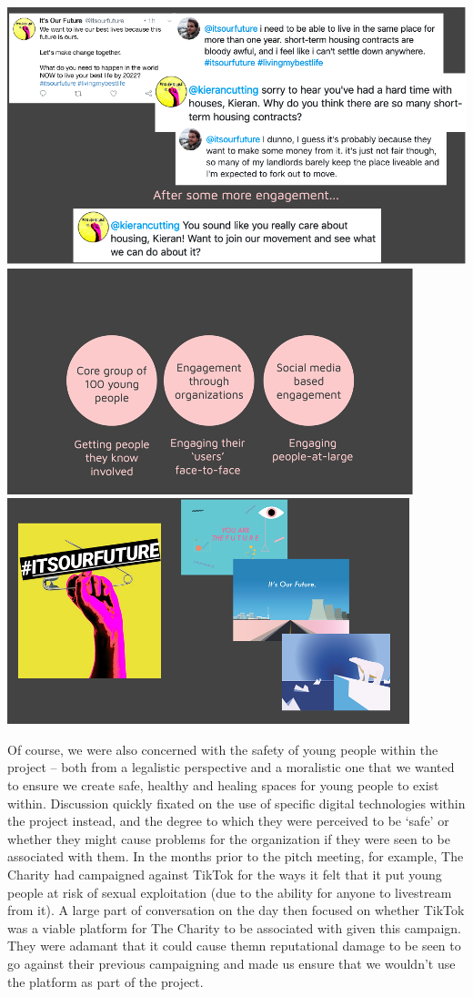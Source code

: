 \includegraphics[]{Images/7/iof-1.png}
\includegraphics[]{Images/7/iof-2.png}
\includegraphics[]{Images/7/iof-3.png}


Of course, we were also concerned with the safety of young people within the project – both from a legalistic perspective and a moralistic one that we wanted to ensure we create safe, healthy and healing spaces for young people to exist within. Discussion quickly fixated on the use of specific digital technologies within the project instead, and the degree to which they were perceived to be ‘safe’ or whether they might cause problems for the organization if they were seen to be associated with them. In the months prior to the pitch meeting, for example, The Charity had campaigned against TikTok for the ways it felt that it put young people at risk of sexual exploitation (due to the ability for anyone to livestream from it). A large part of conversation on the day then focused on whether TikTok was a viable platform for The Charity to be associated with given this campaign. They were adamant that it could cause themn reputational damage to be seen to go against their previous campaigning and made us ensure that we wouldn’t use the platform as part of the project.

